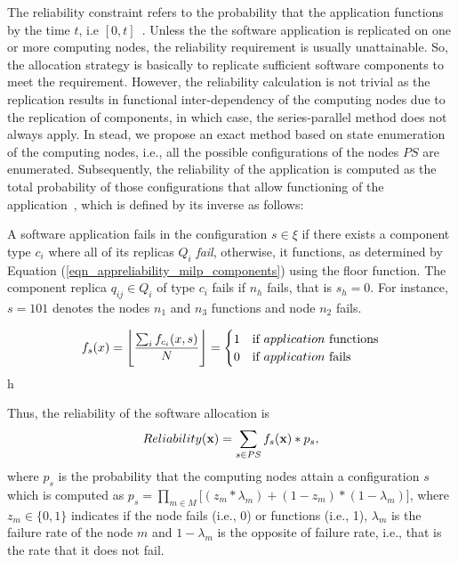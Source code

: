 The reliability constraint refers to the probability that the application functions by the time $t$, i.e $[0,t]$~\cite{Goel1985SoftwareApplicability}. %
Unless the the software application is replicated on one or more computing nodes, the reliability requirement is usually unattainable. So, the allocation strategy is basically to replicate sufficient software components to meet the requirement. However, the reliability calculation is not trivial as the replication results in functional inter-dependency of the computing nodes due to the replication of components, in which case, the series-parallel method does not always apply. In stead, we propose an exact method based on state enumeration~\cite{Lucet1999ExactReliability} of the computing nodes, i.e., all the possible configurations of the nodes $PS$ are enumerated. Subsequently, the reliability of the application is computed as the total probability of those configurations that allow functioning of the application~\cite{Mahmud5222}, which is defined by its inverse as follows:
\begin{definition}
	A software application fails in the configuration $s\in\xi$ if there exists a component type $c_i$ where all of its replicas $Q_i$ \textit{fail}, otherwise, it functions, as determined by Equation (\ref{eqn_appreliability_milp_components}) using the floor function. The component replica $q_{ij}\in Q_i$ of type $c_i$ fails if $n_h$ fails, that is $s_h=0$. For instance, $s=101$ denotes the nodes $n_1$ and $n_3$ functions and node $n_2$ fails. 
\end{definition}
\begin{align}
f_s(x) = \floor[\Bigg]{\frac{\sum_if_{c_i}(x,s)}{N}}=
\begin{cases}
1 & \mbox{if } application \mbox{ functions}\\
0 & \mbox{if } application \mbox{ fails}
\end{cases}\label{eqn_appreliability_milp_components}
\end{align}h

Thus, the reliability of the software allocation is
\begin{align}
\label{eqn_appreliability_milp}
Reliability(\x)=\sum_{s\in PS}f_s(\x)*p_s,
\end{align}
where $p_s$ is the probability that the computing nodes attain a configuration $s$ which is computed as $p_s=\prod_{m\in M}\big[(z_m*\lambda_m) + (1-z_m)*(1-\lambda_m)\big]$, where $z_m\in\{0,1\}$ indicates if the node fails (i.e., 0) or functions (i.e., 1), $\lambda_m$ is the failure rate of the node $m$ and $1-\lambda_m$ is the opposite of failure rate, i.e., that is the rate that it does not fail.

